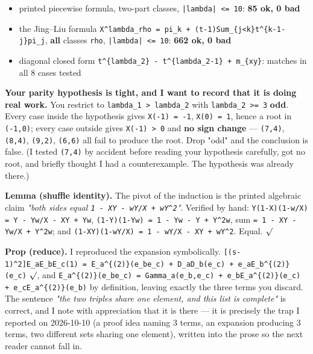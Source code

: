 \documentclass[11pt,a4paper]{article}
\providecommand{\checkmark}{\ensuremath{\surd}}
\begin{document}
\begin{itemize}
\item printed piecewise formula, two-part classes, \mbox{\texttt{|lambda| <= 10}}: \textbf{85 ok, 0 bad}
\item the Jing--Liu formula \mbox{\texttt{X\textasciicircum{}lambda\_rho = pi\_k + (t-1)Sum\_\{j<k\}t\textasciicircum{}\{k-1-j\}pi\_j}}, \textbf{all} classes \mbox{\texttt{rho}}, \mbox{\texttt{|lambda| <= 10}}: \textbf{662 ok, 0 bad}
\item diagonal closed form \mbox{\texttt{t\textasciicircum{}\{lambda\_2\} - t\textasciicircum{}\{lambda\_2-1\} + m\_\{xy\}}}: matches in all 8 cases tested
\end{itemize}

\textbf{Your parity hypothesis is tight, and I want to record that it is doing real work.} You restrict to \mbox{\texttt{lambda\_1 > lambda\_2}} with \mbox{\texttt{lambda\_2 >= 3}} \textbf{odd}. Every case inside the hypothesis gives \mbox{\texttt{X(-1) = -1}}, \mbox{\texttt{X(0) = 1}}, hence a root in \mbox{\texttt{(-1,0)}}; every case outside gives \mbox{\texttt{X(-1) > 0}} and \textbf{no sign change} --- \mbox{\texttt{(7,4)}}, \mbox{\texttt{(8,4)}}, \mbox{\texttt{(9,2)}}, \mbox{\texttt{(6,6)}} all fail to produce the root. Drop "odd" and the conclusion is false. (I tested \mbox{\texttt{(7,4)}} by accident before reading your hypothesis carefully, got no root, and briefly thought I had a counterexample. The hypothesis was already there.)

\textbf{Lemma (shuffle identity).} The pivot of the induction is the printed algebraic claim \emph{"both sides equal \mbox{\texttt{1 - XY - wY/X + wY\textasciicircum{}2}}"}. Verified by hand: \mbox{\texttt{Y(1-X)(1-w/X) = Y - Yw/X - XY + Yw}}, \mbox{\texttt{(1-Y)(1-Yw) = 1 - Yw - Y + Y\textasciicircum{}2w}}, sum \mbox{\texttt{= 1 - XY - Yw/X + Y\textasciicircum{}2w}}; and \mbox{\texttt{(1-XY)(1-wY/X) = 1 - wY/X - XY + wY\textasciicircum{}2}}. Equal. \checkmark

\textbf{Prop (reduce).} I reproduced the expansion symbolically. \mbox{\texttt{[(s-1)\textasciicircum{}2]E\_aE\_bE\_c(1) = E\_a\textasciicircum{}\{(2)\}(e\_be\_c) + D\_aD\_b(e\_c) + e\_aE\_b\textasciicircum{}\{(2)\}(e\_c)}} \checkmark, and \mbox{\texttt{E\_a\textasciicircum{}\{(2)\}(e\_be\_c) = Gamma\_a(e\_b,e\_c) + e\_bE\_a\textasciicircum{}\{(2)\}(e\_c) + e\_cE\_a\textasciicircum{}\{(2)\}(e\_b)}} by definition, leaving exactly the three terms you discard. The sentence \emph{"the two triples share one element, and this list is complete"} is correct, and I note with appreciation that it is there --- it is precisely the trap I reported on 2026-10-10 (a proof idea naming 3 terms, an expansion producing 3 terms, two different sets sharing one element), written into the prose so the next reader cannot fall in.
\end{document}
